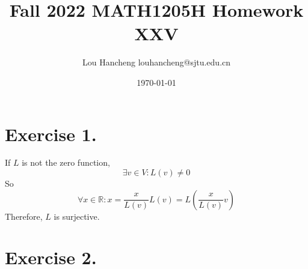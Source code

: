 \documentclass[12pt, a4paper, oneside]{article}
\title{Fall 2022 MATH1205H Homework XXV}
\author{Lou Hancheng \quad louhancheng@sjtu.edu.cn}
\date{\today}
\begin{document}
    \maketitle
    \section*{Exercise 1.}
        If $L$ is not the zero function,
        $$
            \exists v\in V:L(v)\neq 0
        $$
        So
        $$
            \forall x\in \mathbb{R}:x=\frac{x}{L(v)}L(v)=L(\frac{x}{L(v)}v)
        $$
        Therefore, $L$ is surjective.
    \section*{Exercise 2.}
\end{document}
